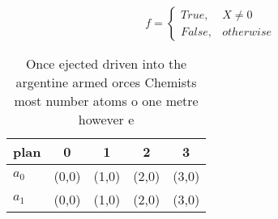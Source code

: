 \documentclass[a4paper]{article}
\begin{document}
\begin{equation}   f =
\begin{cases} True, & X \neq 0\\
False, & otherwise
\end{cases}
\end{equation}

\begin{table}
\begin{adjustbox}{width=0.5\columnwidth}
\begin{tabular}{|l|l|l|l|l|}
\hline
\textbf{plan} & \multicolumn{1}{c|}{\textbf{0}} & \multicolumn{1}{c|}{\textbf{1}} & \multicolumn{1}{c|}{\textbf{2}} & \multicolumn{1}{c|}{\textbf{3}} \\ \hline
\textbf{$a_0$}  & (0,0) & (1,0) & (2,0) & (3,0) \\ \hline
\textbf{$a_1$}  & (0,0) & (1,0) & (2,0) & (3,0) \\ \hline
\end{tabular}
\end{adjustbox}
\caption{Once ejected driven into the argentine armed orces Chemists most number atoms o one metre however e
}
\end{table}
\end{document}
